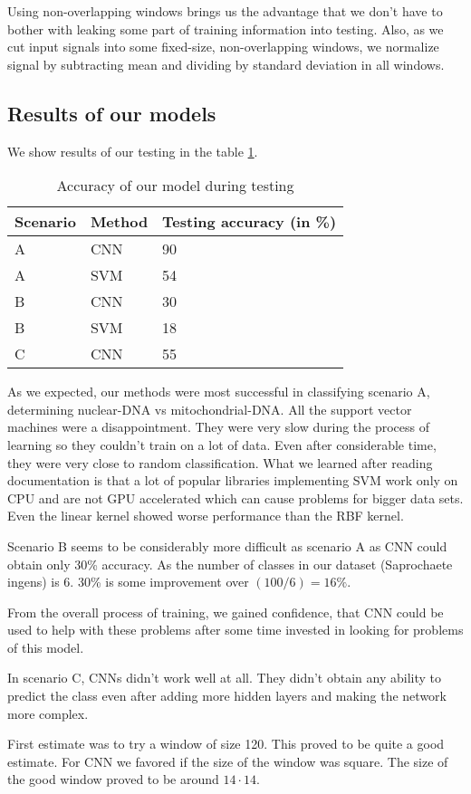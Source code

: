 Using non-overlapping windows brings us the advantage that we don't have to bother
with leaking some part of training information into testing. Also, as we cut input
signals into some fixed-size, non-overlapping windows, we normalize signal by subtracting
mean and dividing by standard deviation in all windows.

\subsection{Results of our models}

We show results of our testing in the table \ref{tab:mlResults}.

\begin{table}
\caption[Accuracy of our model during testing]{Accuracy of our model during testing}
\label{tab:mlResults}
\begin{center}
\begin{tabular}{|l|l|l|}
\hline
Scenario & Method & Testing accuracy (in \%)\\
\hline
A & CNN & 90\\
A & SVM & 54\\
B & CNN & 30\\
B & SVM & 18\\
C & CNN & 55\\
\hline
\end{tabular}
\end{center}
\end{table}

As we expected, our methods were most successful in classifying scenario A, determining
nuclear-DNA vs mitochondrial-DNA. All the support vector machines were a disappointment.
They were very slow during the process of learning so they couldn't train on a lot of
data. Even after considerable time, they were very close to random classification.
What we learned after reading documentation is that a lot of popular libraries
implementing SVM work only on CPU and are not GPU accelerated which can cause
problems for bigger data sets. Even the linear kernel showed worse performance than the RBF kernel.

\medskip

Scenario B seems to be considerably more difficult as scenario A as CNN could obtain
only 30\% accuracy. As the number of classes in our dataset (Saprochaete ingens)
is 6. 30\% is some improvement over $(100/6)=16\%$.

From the overall process of training, we gained confidence, that CNN could
be used to help with these problems after some time invested in looking for
problems of this model.

\medskip

In scenario C, CNNs didn't work well at all. They didn't obtain any ability to predict
the class even after adding more hidden layers and making the network more complex.

\medskip

First estimate was to try a window of size 120. This proved to be quite a good estimate.
For CNN we favored if the size of the window was square. The size of the good window
proved to be around $14\cdot 14$.
